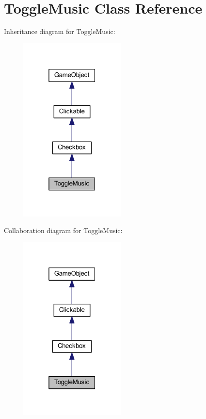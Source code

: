 \hypertarget{class_toggle_music}{\section{Toggle\+Music Class Reference}
\label{class_toggle_music}
}


Inheritance diagram for Toggle\+Music\+:\nopagebreak
\begin{figure}[H]
\begin{center}
\leavevmode
\includegraphics[width=151pt]{class_toggle_music__inherit__graph}
\end{center}
\end{figure}


Collaboration diagram for Toggle\+Music\+:\nopagebreak
\begin{figure}[H]
\begin{center}
\leavevmode
\includegraphics[width=151pt]{class_toggle_music__coll__graph}
\end{center}
\end{figure}
